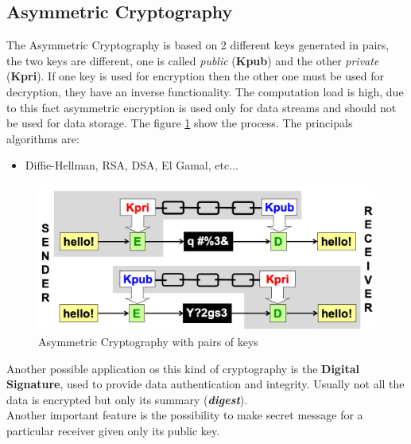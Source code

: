 \documentclass[12pt]{article}
\begin{document}
\subsection{Asymmetric Cryptography}
The Asymmetric Cryptography is based on 2 different keys generated in pairs, the two keys are different, one is called \textit{public} (\textbf{Kpub}) and the other \textit{private} (\textbf{Kpri}). If one key is used for encryption then the other one must be used for decryption, they have an inverse functionality. The computation load is high, due to this fact asymmetric encryption is used only for data streams and should not be used for data storage. The figure \ref{fig:asymmetric} show the process. The principals algorithms are:
\begin{itemize}
  \item Diffie-Hellman, RSA, DSA, El Gamal, etc...
\end{itemize}
\begin{figure}[H]
   \centering
   \includegraphics[width=\linewidth]{images/asymmetric.png}
   \caption{Asymmetric Cryptography with pairs of keys}
   \label{fig:asymmetric}
\end{figure}
Another possible application os this kind of cryptography is the \textbf{Digital Signature}, used to provide data authentication and integrity. Usually not all the data is encrypted but only its summary (\textbf{\textit{digest}}).\\
Another important feature is the possibility to make secret message for a particular receiver given only its public key.\\
\end{document}
